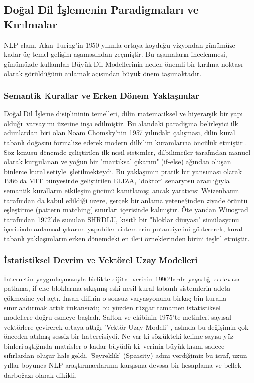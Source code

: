 \documentclass[12pt,a4paper]{report}
\begin{document}
\subsection{Doğal Dil İşlemenin Paradigmaları ve Kırılmalar}
NLP alanı, Alan Turing’in 1950 yılında ortaya koyduğu vizyondan günümüze kadar üç temel gelişim aşamasından geçmiştir. Bu aşamaların incelenmesi, günümüzde kullanılan Büyük Dil Modellerinin neden önemli bir kırılma noktası olarak görüldüğünü anlamak açısından büyük önem taşımaktadır.

\subsubsection{Semantik Kurallar ve Erken Dönem Yaklaşımlar}
Doğal Dil İşleme disiplininin temelleri, dilin matematiksel ve hiyerarşik bir yapı olduğu varsayımı üzerine inşa edilmiştir. Bu alandaki paradigma belirleyici ilk adımlardan biri olan Noam Chomsky'nin 1957 yılındaki çalışması, dilin kural tabanlı doğasını formalize ederek modern dilbilim kuramlarına öncülük etmiştir \cite{chomsky1957syntactic}. Söz konusu dönemde geliştirilen ilk nesil sistemler, dilbilimciler tarafından manuel olarak kurgulanan ve yoğun bir "mantıksal çıkarım" (if-else) ağından oluşan binlerce kural setiyle işletilmekteydi. Bu yaklaşımın pratik bir yansıması olarak 1966'da MIT bünyesinde geliştirilen ELIZA, "doktor" senaryosu aracılığıyla semantik kuralların etkileşim gücünü kanıtlamış; ancak yaratıcısı Weizenbaum tarafından da kabul edildiği üzere, gerçek bir anlama yeteneğinden ziyade örüntü eşleştirme (pattern matching) sınırları içerisinde kalmıştır. Öte yandan Winograd \cite{winograd1972understanding} tarafından 1972'de sunulan SHRDLU, kısıtlı bir "bloklar dünyası" simülasyonu içerisinde anlamsal çıkarım yapabilen sistemlerin potansiyelini göstererek, kural tabanlı yaklaşımların erken dönemdeki en ileri örneklerinden birini teşkil etmiştir.

\subsubsection{İstatistiksel Devrim ve Vektörel Uzay Modelleri}
İnternetin yaygınlaşmasıyla birlikte dijital verinin 1990'larda yaşadığı o devasa patlama, if-else bloklarına sıkışmış eski nesil kural tabanlı sistemlerin adeta çökmesine yol açtı. İnsan dilinin o sonsuz varyasyonunu birkaç bin kuralla sınırlandırmak artık imkansızdı; bu yüzden rüzgar tamamen istatistiksel modellere doğru esmeye başladı. Salton ve ekibinin 1975'te metinleri sayısal vektörlere çevirerek ortaya attığı 'Vektör Uzay Modeli' \cite{salton1975vector}, aslında bu değişimin çok önceden atılmış sessiz bir habercisiydi. Ne var ki sözlükteki kelime sayısı yüz binleri aştığında matrisler o kadar büyüdü ki, verinin büyük kısmı sadece sıfırlardan oluşur hale geldi. 'Seyreklik' (Sparsity) adını verdiğimiz bu israf, uzun yıllar boyunca NLP araştırmacılarının karşısına devasa bir hesaplama ve bellek darboğazı olarak dikildi. 
\end{document}
